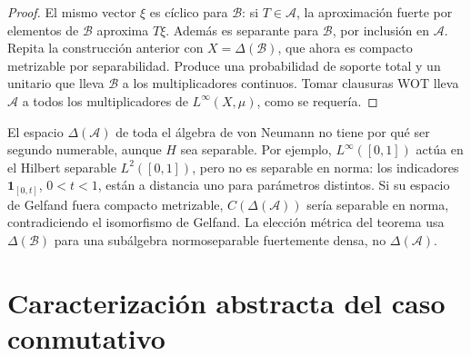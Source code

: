 \begin{proof}
El mismo vector $\xi$ es cíclico para $\mathcal B$: si $T\in\mathcal A$, la aproximación fuerte por elementos de $\mathcal B$ aproxima $T\xi$. Además es separante para $\mathcal B$, por inclusión en $\mathcal A$. Repita la construcción anterior con $X=\Delta(\mathcal B)$, que ahora es compacto metrizable por separabilidad. Produce una probabilidad de soporte total y un unitario que lleva $\mathcal B$ a los multiplicadores continuos. Tomar clausuras WOT lleva $\mathcal A$ a todos los multiplicadores de $L^\infty(X,\mu)$, como se requería.
\end{proof}

\begin{observacion}
El espacio $\Delta(\mathcal A)$ de toda el álgebra de von Neumann no tiene por qué ser segundo numerable, aunque $H$ sea separable. Por ejemplo, $L^\infty([0,1])$ actúa en el Hilbert separable $L^2([0,1])$, pero no es separable en norma: los indicadores $\mathbf1_{[0,t]}$, $0<t<1$, están a distancia uno para parámetros distintos. Si su espacio de Gelfand fuera compacto metrizable, $C(\Delta(\mathcal A))$ sería separable en norma, contradiciendo el isomorfismo de Gelfand. La elección métrica del teorema usa $\Delta(\mathcal B)$ para una subálgebra normoseparable fuertemente densa, no $\Delta(\mathcal A)$.
\end{observacion}

\section{Caracterización abstracta del caso conmutativo}


